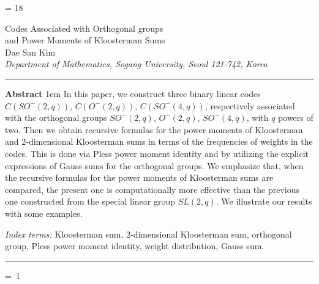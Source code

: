 \documentclass[a4,12pt]{elsart}
\begin{document}
\begin{minipage}{\textwidth}
{    
    
    \let\footnotesize=
    
    
    \skip\@mpfootins = 18\p@ {}\p@
    
               }
\parskip 12pt

\leftskip=2pc
\begin{center}
{\LARGE Codes Associated with Orthogonal groups\\
 and Power Moments of Kloosterman Sums}\\[30pt]

Dae San Kim\\[12pt]
\itshape
Department of Mathematics, Sogang University, Seoul
121-742, Korea
\end{center}

\bigskip
\leftskip=0pt

\hrule\vskip 8pt
\begin{small}
{\bfseries Abstract}
\parindent 1em
In this paper, we construct three binary linear codes
$C(SO^{-}(2,q))$, $C(O^{-}(2,q))$, $C(SO^{-}(4,q))$, respectively
associated with the orthogonal groups $SO^{-}(2,q)$, $O^{-}(2,q)$,
$SO^{-}(4,q)$, with $q$ powers of two. Then we obtain recursive
formulas for the power moments of Kloosterman and $2$-dimensional
Kloosterman sums in terms of the frequencies of weights in the
codes. This is done via Pless power moment identity and by utilizing
the explicit expressions of Gauss sums for the orthogonal groups. We
emphasize that, when the recursive formulas for the power moments of
Kloosterman sums are compared, the present one is computationally
more effective than the previous one constructed from the special
linear group $SL(2,q)$. We illustrate our results with some
examples.

\noindent\textit{Index terms:}
Kloosterman sum, 2-dimensional Kloosterman sum, orthogonal group, Pless power moment identity, weight distribution, Gauss sum.\\
\end{small}

\vskip 10pt\hrule

\leftskip=0pt

\vspace{24pt}

 =\hbox{\footnotesize
1}  


\end{minipage}
\end{document}

